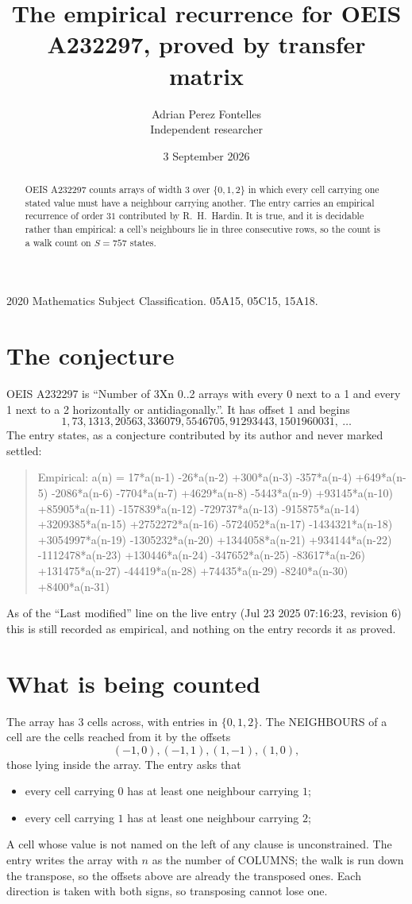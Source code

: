 \documentclass[11pt,a4paper]{article}
\title{The empirical recurrence for OEIS A232297, proved by transfer matrix}
\author{Adrian Perez Fontelles\\ \small Independent researcher}
\date{3 September 2026}
\theoremstyle{plain}
\theoremstyle{definition}
\begin{document}
\maketitle

\begin{abstract}
OEIS A232297 counts arrays of width $3$ over $\{0,1,2\}$ in which every cell carrying one stated
value must have a neighbour carrying another. The entry carries an empirical recurrence of
order $31$ contributed by R.~H.~Hardin. It is true, and it is decidable rather than
empirical: a cell's neighbours lie in three consecutive rows, so the count is a walk count on
$S=757$ states.
\end{abstract}

\noindent\small 2020 Mathematics Subject Classification. 05A15, 05C15, 15A18.\normalsize

\section{The conjecture}

OEIS A232297 is ``Number of 3Xn 0..2 arrays with every 0 next to a 1 and every 1 next to a 2 horizontally or antidiagonally.''. It has offset $1$ and begins
\[
1, 73, 1313, 20563, 336079, 5546705, 91293443, 1501960031,\ \dots
\]
The entry states, as a conjecture contributed by its author and never marked settled:
\begin{quote}
Empirical: a(n) = 17*a(n-1) -26*a(n-2) +300*a(n-3) -357*a(n-4) +649*a(n-5) -2086*a(n-6) -7704*a(n-7) +4629*a(n-8) -5443*a(n-9) +93145*a(n-10) +85905*a(n-11) -157839*a(n-12) -729737*a(n-13) -915875*a(n-14) +3209385*a(n-15) +2752272*a(n-16) -5724052*a(n-17) -1434321*a(n-18) +3054997*a(n-19) -1305232*a(n-20) +1344058*a(n-21) +934144*a(n-22) -1112478*a(n-23) +130446*a(n-24) -347652*a(n-25) -83617*a(n-26) +131475*a(n-27) -44419*a(n-28) +74435*a(n-29) -8240*a(n-30) +8400*a(n-31)
\end{quote}
As of the ``Last modified'' line on the live entry (Jul 23 2025 07:16:23, revision 6) this is still
recorded as empirical, and nothing on the entry records it as proved.

\section{What is being counted}

The array has $3$ cells across, with entries in $\{0,1,2\}$. The NEIGHBOURS of a cell are the
cells reached from it by the offsets
\[
(-1,0), (-1,1), (1,-1), (1,0),
\]
those lying inside the array. The entry asks that
\begin{itemize}
\item every cell carrying $0$ has at least one neighbour carrying $1$;
\item every cell carrying $1$ has at least one neighbour carrying $2$;

\end{itemize}
A cell whose value is not named on the left of any clause is unconstrained. The entry writes the array with $n$ as the number of COLUMNS; the walk is run down the transpose, so the offsets above are already the transposed ones. Each direction is taken with both signs, so transposing cannot lose one.
\end{document}
